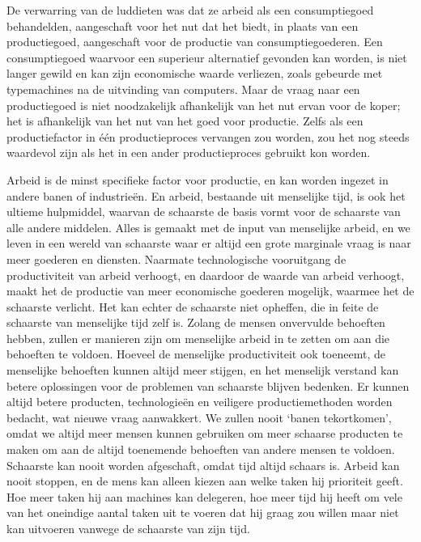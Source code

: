 De verwarring van de luddieten was dat ze arbeid als een consumptiegoed behandelden, aangeschaft voor het nut dat het biedt, in plaats van een productiegoed, aangeschaft voor de productie van consumptiegoederen. Een consumptiegoed waarvoor een superieur alternatief gevonden kan worden, is niet langer gewild en kan zijn economische waarde verliezen, zoals gebeurde met typemachines na de uitvinding van computers. Maar de vraag naar een productiegoed is niet noodzakelijk afhankelijk van het nut ervan voor de koper; het is afhankelijk van het nut van het goed voor productie. Zelfs als een productiefactor in één productieproces vervangen zou worden, zou het nog steeds waardevol zijn als het in een ander productieproces gebruikt kon worden.

Arbeid is de minst specifieke factor voor productie, en kan worden ingezet in andere banen of industrieën. En arbeid, bestaande uit menselijke tijd, is ook het ultieme hulpmiddel, waarvan de schaarste de basis vormt voor de schaarste van alle andere middelen. Alles is gemaakt met de input van menselijke arbeid, en we leven in een wereld van schaarste waar er altijd een grote marginale vraag is naar meer goederen en diensten. Naarmate technologische vooruitgang de productiviteit van arbeid verhoogt, en daardoor de waarde van arbeid verhoogt, maakt het de productie van meer economische goederen mogelijk, waarmee het de schaarste verlicht. Het kan echter de schaarste niet opheffen, die in feite de schaarste van menselijke tijd zelf is. Zolang de mensen onvervulde behoeften hebben, zullen er manieren zijn om menselijke arbeid in te zetten om aan die behoeften te voldoen. Hoeveel de menselijke productiviteit ook toeneemt, de menselijke behoeften kunnen altijd meer stijgen, en het menselijk verstand kan betere oplossingen voor de problemen van schaarste blijven bedenken. Er kunnen altijd betere producten, technologieën en veiligere productiemethoden worden bedacht, wat nieuwe vraag aanwakkert. We zullen nooit `banen tekortkomen', omdat we altijd meer mensen kunnen gebruiken om meer schaarse producten te maken om aan de altijd toenemende behoeften van andere mensen te voldoen. Schaarste kan nooit worden afgeschaft, omdat tijd altijd schaars is. Arbeid kan nooit stoppen, en de mens kan alleen kiezen aan welke taken hij prioriteit geeft. Hoe meer taken hij aan machines kan delegeren, hoe meer tijd hij heeft om vele van het oneindige aantal taken uit te voeren dat hij graag zou willen maar niet kan uitvoeren vanwege de schaarste van zijn tijd.

